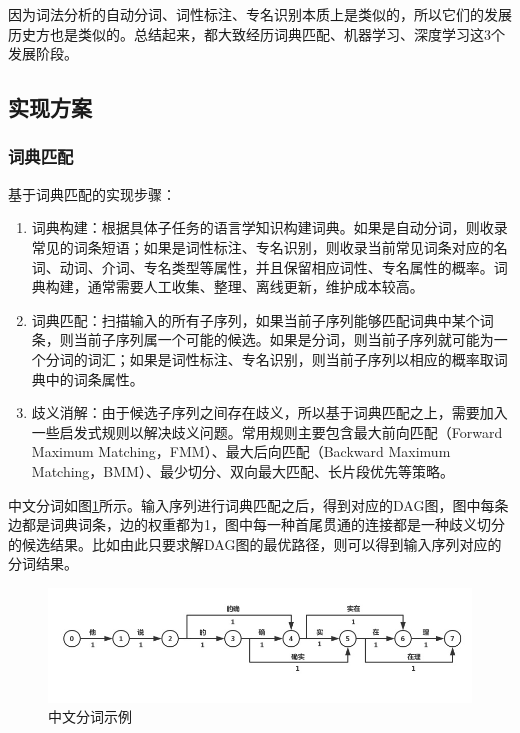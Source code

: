 因为词法分析的自动分词、词性标注、专名识别本质上是类似的，所以它们的发展历史方也是类似的。总结起来，都大致经历词典匹配、机器学习、深度学习这3个发展阶段。

\subsection{实现方案}

\subsubsection{词典匹配}
\noindent
基于词典匹配的实现步骤：

\begin{enumerate}
\item 词典构建：根据具体子任务的语言学知识构建词典。如果是自动分词，则收录常见的词条短语；如果是词性标注、专名识别，则收录当前常见词条对应的名词、动词、介词、专名类型等属性，并且保留相应词性、专名属性的概率。词典构建，通常需要人工收集、整理、离线更新，维护成本较高。
\item 词典匹配：扫描输入的所有子序列，如果当前子序列能够匹配词典中某个词条，则当前子序列属一个可能的候选。如果是分词，则当前子序列就可能为一个分词的词汇；如果是词性标注、专名识别，则当前子序列以相应的概率取词典中的词条属性。
\item 歧义消解：由于候选子序列之间存在歧义，所以基于词典匹配之上，需要加入一些启发式规则以解决歧义问题。常用规则主要包含最大前向匹配（Forward Maximum Matching，FMM）、最大后向匹配（Backward Maximum Matching，BMM）、最少切分、双向最大匹配、长片段优先等策略\cite{wong1996chinese}\cite{weichun2013research}。
\end{enumerate}

中文分词如图\ref{fig:word_segmentation_example}所示。输入序列进行词典匹配之后，得到对应的DAG图，图中每条边都是词典词条，边的权重都为1，图中每一种首尾贯通的连接都是一种歧义切分的候选结果。比如由此只要求解DAG图的最优路径，则可以得到输入序列对应的分词结果。

\begin{figure}[h!]
\centering
\includegraphics[scale=0.4]{img/chapter_nlp/word_segmentation_example.jpg}
\caption{中文分词示例}
\label{fig:word_segmentation_example}
\end{figure}


